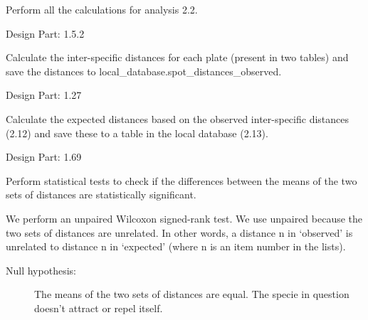 \documentclass[letterpaper,10pt,english]{sphinxmanual}
\begin{document}

\begin{fulllineitems}
\label{setlyze/analysis/attraction_inter:setlyze.analysis.attraction_inter.Start}
Perform all the calculations for analysis 2.2.

Design Part: 1.5.2

\begin{fulllineitems}
\label{setlyze/analysis/attraction_inter:setlyze.analysis.attraction_inter.Start.calculate_distances_inter}
Calculate the inter-specific distances for each plate (present
in two tables) and save the distances to
local\_database.spot\_distances\_observed.

Design Part: 1.27

\end{fulllineitems}


\begin{fulllineitems}
\label{setlyze/analysis/attraction_inter:setlyze.analysis.attraction_inter.Start.calculate_distances_inter_expected}
Calculate the expected distances based on the observed
inter-specific distances (2.12) and save these to a table in the
local database (2.13).

Design Part: 1.69

\end{fulllineitems}


\begin{fulllineitems}
\label{setlyze/analysis/attraction_inter:setlyze.analysis.attraction_inter.Start.calculate_significance}
Perform statistical tests to check if the differences between
the means of the two sets of distances are statistically
significant.

We perform an unpaired Wilcoxon signed-rank test. We use unpaired
because the two sets of distances are unrelated. In other words,
a distance n in `observed' is unrelated to distance n in
`expected' (where n is an item number in the lists).
\begin{description}
\item[{Null hypothesis:}] \leavevmode
The means of the two sets of distances are
equal. The specie in question doesn't attract or repel itself.


\end{description}
\end{fulllineitems}
\end{fulllineitems}
\end{document}
